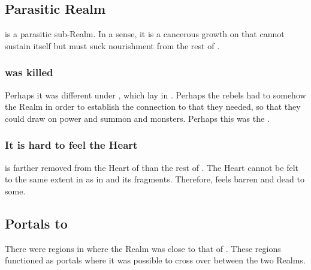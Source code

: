 \subsection{Parasitic Realm}
\Nyx{} is a parasitic sub-Realm. 
In a sense, it is a cancerous growth on \Miith{} that cannot sustain itself but must suck nourishment from the rest of \Miith{}. 





\subsubsection{\Nyx{} was killed}
Perhaps it was different under , which lay in \Nyx. 
Perhaps the rebels had to somehow  the Realm in order to establish the connection to \Erebos{} that they needed, so that they could draw on \Erebean{} power and summon \banes{} and monsters. 
Perhaps this was the . 




\subsubsection{It is hard to feel the Heart}
\Nyx{} is farther removed from the Heart of \Miith{} than the rest of \Miith{}. 
The Heart cannot be felt to the same extent in \Nyx{} as in  and its fragments. 
Therefore, \Nyx{} feels barren and dead to some. 










\subsection{Portals to \Azmith}
There were regions in \Nyx where the Realm was close to that of \Azmith. 
These regions functioned as portals where it was possible to cross over between the two Realms. 









